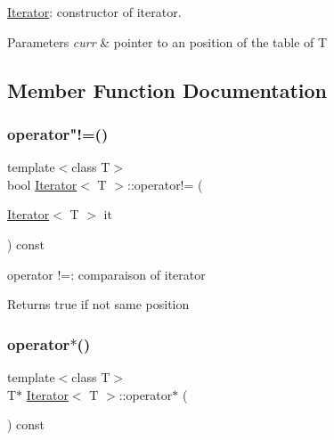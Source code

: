 \hyperlink{class_iterator}{Iterator}\+: constructor of iterator. 


\begin{DoxyParams}{Parameters}
{\em curr} & pointer to an position of the table of T \\
\hline
\end{DoxyParams}


\subsection{Member Function Documentation}
\mbox{\label{class_iterator_a5e8725bfbba9901f8148e427a9b8886a}} 
\subsubsection{\texorpdfstring{operator"!=()}{operator!=()}}
{\footnotesize\ttfamily template$<$class T$>$ \\
bool \hyperlink{class_iterator}{Iterator}$<$ T $>$\+::operator!= (\begin{DoxyParamCaption}\item[{\hyperlink{class_iterator}{Iterator}$<$ T $>$}]{it }\end{DoxyParamCaption}) const\hspace{0.3cm}{\ttfamily [inline]}}



operator !=\+: comparaison of iterator 

\begin{DoxyReturn}{Returns}
true if not same position 
\end{DoxyReturn}
\mbox{\label{class_iterator_a10ab6542ca4a31393939291780fa7fa2}} 
\subsubsection{\texorpdfstring{operator$\ast$()}{operator*()}}
{\footnotesize\ttfamily template$<$class T$>$ \\
T$\ast$ \hyperlink{class_iterator}{Iterator}$<$ T $>$\+::operator$\ast$ (\begin{DoxyParamCaption}{ }\end{DoxyParamCaption}) const\hspace{0.3cm}{\ttfamily [inline]}}



